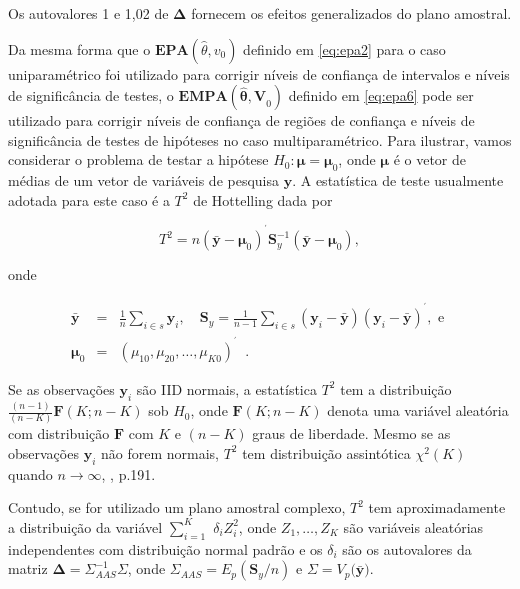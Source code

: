 \documentclass[]{book}
\theoremstyle{definition}
\theoremstyle{definition}
\theoremstyle{definition}
\theoremstyle{remark}
\begin{document}
Os autovalores 1 e 1,02 de \(\mathbf{\Delta}\) fornecem os efeitos
generalizados do plano amostral.

Da mesma forma que o \(\mathbf{EPA}\left( \hat{\theta},v_{0}\right)\)
definido em \eqref{eq:epa2} para o caso uniparamétrico foi utilizado para
corrigir níveis de confiança de intervalos e níveis de significância de
testes, o \(\mathbf{EMPA}(\mathbf{\hat{\theta},V}_{0})\) definido em
\eqref{eq:epa6} pode ser utilizado para corrigir níveis de confiança de
regiões de confiança e níveis de significância de testes de hipóteses no
caso multiparamétrico. Para ilustrar, vamos considerar o problema de
testar a hipótese \(H_{0}:\mathbf{\mu }=\mathbf{\mu }_{0}\), onde
\(\mathbf{\mu }\) é o vetor de médias de um vetor de variáveis de
pesquisa \(\mathbf{y}\). A estatística de teste usualmente adotada para
este caso é a \(T^{2}\) de Hottelling dada por

\begin{equation}
T^{2}=n\left( \mathbf{\bar{y}-\mu }_{0}\right) ^{^{\prime }}\mathbf{S}
_{y}^{-1}\left( \mathbf{\bar{y}-\mu }_{0}\right) , \label{eq:epa11} 
\end{equation}

onde

\begin{eqnarray*}
\mathbf{\bar{y}} &=&\frac{1}{n}\sum\limits_{i\in s}\mathbf{y}_{i},\quad 
\mathbf{S}_{y}=\frac{1}{n-1}\sum\limits_{i\in s}\left( \mathbf{y}_{i}-
\mathbf{\bar{y}}\right) \left( \mathbf{y}_{i}-\mathbf{\bar{y}}\right)
^{^{\prime }},\mbox{ e } \\
\mathbf{\mu }_{0} &=&\left( \mu _{10},\mu _{20},\ldots ,\mu _{K0}\right)
^{^{\prime }}\;\;.
\end{eqnarray*}

Se as observações \(\mathbf{y}_{i}\) são IID normais, a estatística
\(T^{2}\) tem a distribuição
\(\frac{\left( n-1\right) }{\left( n-K\right)}\mathbf{F}\left( K;n-K\right)\)
sob \(H_{0}\), onde \(\mathbf{F}\left( K;n-K\right)\) denota uma
variável aleatória com distribuição \(\mathbf{F}\) com \(K\) e
\(\left( n-K\right)\) graus de liberdade. Mesmo se as observações
\(\mathbf{y}_{i}\) não forem normais, \(T^{2}\) tem distribuição
assintótica \(\chi ^{2}\left(K\right)\) quando \(n\rightarrow \infty\),
\citep{Johnson}, p.191.

Contudo, se for utilizado um plano amostral complexo, \(T^{2}\) tem
aproximadamente a distribuição da variável \(\sum\limits_{i=1}^{K}\)
\(\delta _{i}Z_{i}^{2}\), onde \(Z_{1},\ldots ,Z_{K}\) são variáveis
aleatórias independentes com distribuição normal padrão e os
\(\delta _{i}\) são os autovalores da matriz
\(\mathbf{\Delta }=\Sigma _{AAS}^{-1}\Sigma\), onde
\(\Sigma _{AAS}=E_{p}(\mathbf{S}_{y}/n)\) e
\(\Sigma =V_{p}(\mathbf{\bar{y})}\).
\end{document}

